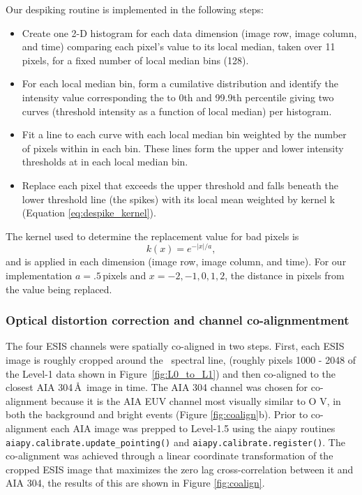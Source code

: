 Our despiking routine is implemented in the following steps:
\begin{itemize}
    \item Create one 2-D histogram for each data dimension (image row, image column, and time) comparing each pixel's value to its local median, taken over 11 pixels, for a fixed number of local median bins (128).
    \item For each local median bin, form a cumilative distribution and identify the intensity value corresponding the to 0th and 99.9th percentile giving two curves (threshold intensity as a function of local median) per histogram.
    \item Fit a line to each curve with each local median bin weighted by the number of pixels within in each bin.  These lines form the upper and lower intensity thresholds at in each local median bin.
    \item Replace each pixel that exceeds the upper threshold and falls beneath the lower threshold line (the spikes) with its local mean weighted by kernel k (Equation \ref{eq:despike_kernel}).
\end{itemize}

The kernel used to determine the replacement value for bad pixels is
\begin{equation} \label{eq:despike_kernel}
    k(x) = e^{-|x|/a},
\end{equation}
and is applied in each dimension (image row, image column, and time).
For our implementation $a=.5$\,pixels and $x= -2, -1, 0, 1 , 2$, the distance in pixels from the value being replaced.  

        
\subsubsection{Optical distortion correction and channel co-alignmentment}
   
   The four ESIS channels were spatially co-aligned in two steps.
First, each ESIS image is roughly cropped around the \ov \ spectral line, (roughly pixels 1000 - 2048 of the Level-1 data shown in Figure~\ref{fig:L0_to_L1}) and then co-aligned to the closest AIA 304\,\AA\ image in time.  
The AIA 304 channel was chosen for co-alignment because it is the AIA EUV channel most visually similar to O V, in both the background and bright events (Figure \ref{fig:coalign}b).
Prior to co-alignment each AIA image was prepped to Level-1.5 using the aiapy routines \texttt{aiapy.calibrate.update\_pointing()} and \texttt{aiapy.calibrate.register()}.
The co-alignment was achieved through a linear coordinate transformation of the cropped ESIS image that maximizes the zero lag cross-correlation between it and AIA 304, the results of this are shown in Figure \ref{fig:coalign}.


